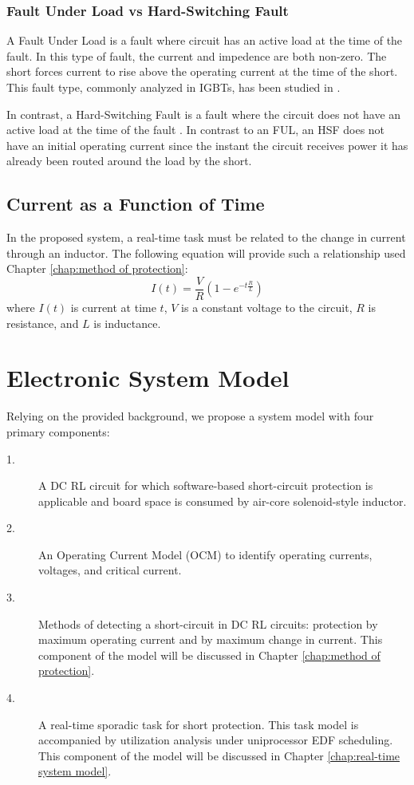 \documentclass[11pt,compsoc,oneside]{report}
\begin{document}
\subsection{Fault Under Load vs Hard-Switching Fault}
A Fault Under Load is a fault where circuit has an active load at the time of the fault. In this type of fault, the current and impedence are both non-zero. The short forces current to rise above the operating current at the time of the short. This fault type, commonly analyzed in IGBTs, has been studied in \cite{scanalysis}.

In contrast, a Hard-Switching Fault is a fault where the circuit does not have an active load at the time of the fault \cite{hiSpeedProtection}. In contrast to an FUL, an HSF does not have an initial operating current since the instant the circuit receives power it has already been routed around the load by the short.

\section{Current as a Function of Time}
In the proposed system, a real-time task must be related to the change in current through an inductor. The following equation will provide such a relationship used Chapter \ref{chap:method of protection}:
\begin{equation}\label{eq:CurrentAtTime}
I(t) = \frac{V}{R}(1-e^{-t \frac{R}{L}})
\end{equation}
where $I(t)$ is current at time $t$, $V$ is a constant voltage to the circuit, $R$ is resistance, and $L$ is inductance.
\chapter{Electronic System Model}\label{chap:electronic system model}
Relying on the provided background, we propose a system model with four primary components:
\begin{description}
\item [1.] A DC RL circuit for which software-based short-circuit protection is applicable and board space is consumed by air-core solenoid-style inductor.
\item [2.] An Operating Current Model (OCM) to identify operating currents, voltages, and critical current.
\item [3.] Methods of detecting a short-circuit in DC RL circuits: protection by maximum operating current and by maximum change in current. This component of the model will be discussed in Chapter \ref{chap:method of protection}.
\item [4.] A real-time sporadic task for short protection. This task model is accompanied by utilization analysis under uniprocessor EDF scheduling. This component of the model will be discussed in Chapter \ref{chap:real-time system model}.
\end{description}
\end{document}
